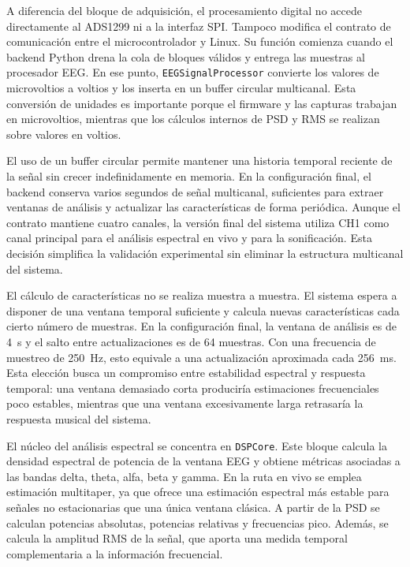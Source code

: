 \documentclass[../main.tex]{subfiles}
\begin{document}
A diferencia del bloque de adquisición, el procesamiento digital no accede directamente al ADS1299 ni a la interfaz SPI. Tampoco modifica el contrato de comunicación entre el microcontrolador y Linux. Su función comienza cuando el backend Python drena la cola de bloques válidos y entrega las muestras al procesador EEG. En ese punto, \texttt{EEGSignalProcessor} convierte los valores de microvoltios a voltios y los inserta en un buffer circular multicanal. Esta conversión de unidades es importante porque el firmware y las capturas trabajan en microvoltios, mientras que los cálculos internos de PSD y RMS se realizan sobre valores en voltios.

El uso de un buffer circular permite mantener una historia temporal reciente de la señal sin crecer indefinidamente en memoria. En la configuración final, el backend conserva varios segundos de señal multicanal, suficientes para extraer ventanas de análisis y actualizar las características de forma periódica. Aunque el contrato mantiene cuatro canales, la versión final del sistema utiliza CH1 como canal principal para el análisis espectral en vivo y para la sonificación. Esta decisión simplifica la validación experimental sin eliminar la estructura multicanal del sistema.

El cálculo de características no se realiza muestra a muestra. El sistema espera a disponer de una ventana temporal suficiente y calcula nuevas características cada cierto número de muestras. En la configuración final, la ventana de análisis es de \SI{4}{\second} y el salto entre actualizaciones es de 64 muestras. Con una frecuencia de muestreo de \SI{250}{\hertz}, esto equivale a una actualización aproximada cada \SI{256}{\milli\second}. Esta elección busca un compromiso entre estabilidad espectral y respuesta temporal: una ventana demasiado corta produciría estimaciones frecuenciales poco estables, mientras que una ventana excesivamente larga retrasaría la respuesta musical del sistema.

El núcleo del análisis espectral se concentra en \texttt{DSPCore}. Este bloque calcula la densidad espectral de potencia de la ventana EEG y obtiene métricas asociadas a las bandas delta, theta, alfa, beta y gamma. En la ruta en vivo se emplea estimación multitaper, ya que ofrece una estimación espectral más estable para señales no estacionarias que una única ventana clásica. A partir de la PSD se calculan potencias absolutas, potencias relativas y frecuencias pico. Además, se calcula la amplitud RMS de la señal, que aporta una medida temporal complementaria a la información frecuencial.
\end{document}
